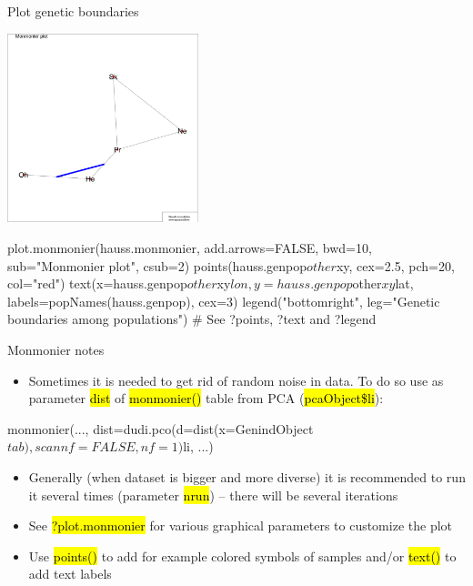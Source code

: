 \documentclass[compress, ucs, xelatex, 11pt, xcolor=svgnames,
  hyperref={
    bookmarks=true,
    unicode=true,
    colorlinks=true,
    pdftitle={Molecular data in R},
    plainpages=false,
    pdfauthor={Vojtech Zeisek},
    pdfsubject={Course about phylogeny and evolution in R},
    pdfcreator={XeLaTeX},
    pdfkeywords={R, evolution, phylogeny, molecular data},
    linkcolor=Tomato,
    anchorcolor=SaddleBrown,
    citecolor=Goldenrod,
    filecolor=DarkMagenta,
    menucolor=Sienna,
    urlcolor=DarkTurquoise,
    pdftex},
  url={hyphens, lowtilde} %
  ]{beamer}
\renewcommand{\texttt}[1]{\hl{\ttfamily #1}}
\begin{document}
\begin{frame}[fragile]{Plot genetic boundaries}
\begin{multicols}{2}
  \includegraphics[height=5.5cm]{monmonier.png}
  \begin{spluscode}
    plot.monmonier(hauss.monmonier,
      add.arrows=FALSE, bwd=10,
      sub="Monmonier plot", csub=2)
    points(hauss.genpop$other$xy,
      cex=2.5, pch=20, col="red")
    text(x=hauss.genpop$other$xy$lon,
      y=hauss.genpop$other$xy$lat,
      labels=popNames(hauss.genpop),
      cex=3)
    legend("bottomright",
      leg="Genetic boundaries\n
      among populations")
    # See ?points, ?text and ?legend
  \end{spluscode}
\end{multicols}
\end{frame}

\begin{frame}[fragile]{Monmonier notes}
  \begin{itemize}
    \item Sometimes it is needed to get rid of random noise in data. To do so use as parameter \texttt{dist} of \texttt{monmonier()} table from PCA (\texttt{pcaObject\$li}):
  \end{itemize}
  \begin{spluscode}
    monmonier(..., dist=dudi.pco(d=dist(x=GenindObject$tab),
      scannf=FALSE, nf=1)$li, ...)
  \end{spluscode}
  \begin{itemize}
    \item Generally (when dataset is bigger and more diverse) it is recommended to run it several times (parameter \texttt{nrun}) -- there will be several iterations
    \item See \texttt{?plot.monmonier} for various graphical parameters to customize the plot
    \item Use \texttt{points()} to add for example colored symbols of samples and/or \texttt{text()} to add text labels
  \end{itemize}
\end{frame}
\end{document}
